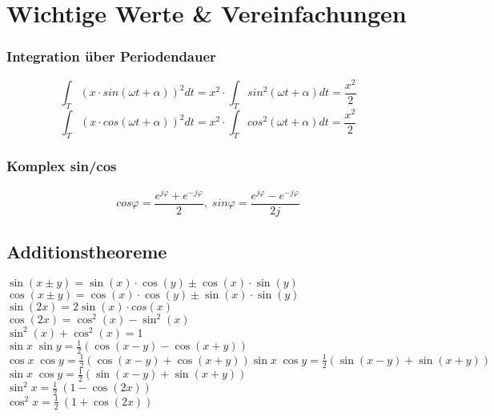 
\section*{Wichtige Werte \& Vereinfachungen}

\subsubsection*{Integration über Periodendauer}
$$\int_T (x \cdot sin(\omega t + \alpha))^2 dt = x^2 \cdot \int_T sin^2(\omega t +\alpha) dt = \frac{x^2}{2}$$
$$\int_T (x \cdot cos(\omega t+\alpha))^2 dt = x^2 \cdot \int_T cos^2(\omega t+\alpha) dt = \frac{x^2}{2}$$


\subsubsection*{Komplex sin/cos}

$$cos \varphi = \frac{e^{j\varphi}+ e^{-j\varphi}}{2}, \; sin \varphi = \frac{e^{j\varphi} - e^{-j\varphi}}{2j} $$

\subsection*{Additionstheoreme}
\begin{multicols}{2}
$\sin(x\pm y) = \sin(x) \cdot \cos(y) \pm \cos(x) \cdot \sin(y)$
\\$\cos(x \pm y)= \cos(x) \cdot \cos(y) \pm \sin(x) \cdot \sin(y)$
\\$\sin(2x) = 2 \sin(x) \cdot cos(x)$
\\$\cos(2x) = \cos^2(x)-\sin^2(x)$
\\$\sin^2(x) + \cos^2(x) = 1 $
\\$\sin x \; \sin y = \frac{1}{2}(\cos (x-y) - \cos (x+y))$
\\$\cos x \; \cos y = \frac{1}{2}(\cos (x-y) + \cos (x+y)) \sin x\;\cos y={\frac {1}{2}}(\sin(x-y)+\sin(x+y))$
\\$\sin x \; \cos y = \frac{1}{2}(\sin (x-y) + \sin (x+y))$
\\$\sin^2 x = \frac{1}{2}\ (1 - \cos (2x)) $
\\$\cos^2 x = \frac{1}{2}\ (1 + \cos (2x)) $
\end{multicols}


